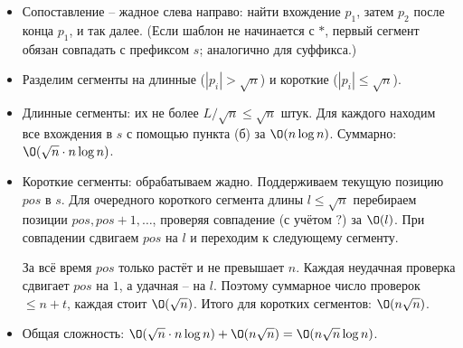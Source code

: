 \begin{enumerate}
\begin{enumerate}
\begin{itemize}
          \item Сопоставление -- жадное слева направо: найти вхождение $p_1$, затем $p_2$ после конца $p_1$, и так далее. (Если шаблон не начинается с ${*}$, первый сегмент обязан совпадать с префиксом $s$; аналогично для суффикса.)

          \item Разделим сегменты на длинные ($|p_i| > \sqrt{n}$) и короткие ($|p_i| \leq \sqrt{n}$).

          \item Длинные сегменты: их не более $L / \sqrt{n} \leq \sqrt{n}$ штук. Для каждого находим все вхождения в $s$ с помощью пункта (б) за $\O(n \log n)$. Суммарно: $\O(\sqrt{n} \cdot n \log n)$.

          \item Короткие сегменты: обрабатываем жадно. Поддерживаем текущую позицию $pos$ в $s$. Для очередного короткого сегмента длины $l \leq \sqrt{n}$ перебираем позиции $pos, pos+1, \ldots$, проверяя совпадение (с учётом ${?}$) за $\O(l)$. При совпадении сдвигаем $pos$ на $l$ и переходим к следующему сегменту.

          За всё время $pos$ только растёт и не превышает $n$. Каждая неудачная проверка сдвигает $pos$ на $1$, а удачная -- на $l$. Поэтому суммарное число проверок $\leq n + t$, каждая стоит $\O(\sqrt{n})$. Итого для коротких сегментов: $\O(n \sqrt{n})$.

          \item Общая сложность: $\O(\sqrt{n} \cdot n \log n) + \O(n\sqrt{n}) = \O(n \sqrt{n} \log n)$.
        \end{itemize}
    \end{enumerate}

\end{enumerate}
